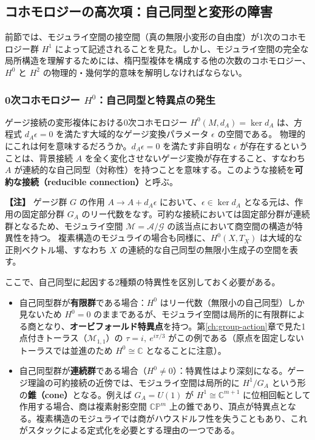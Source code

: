 \documentclass[uplatex, dvipdfmx, book]{jsbook}
\let\origsubsection\subsection
\let\origsubsubsection\subsubsection
\renewcommand{\section}{\origsubsection}
\renewcommand{\subsection}{\origsubsubsection}
\renewcommand{\subsubsection}{\paragraph}
\newenvironment{note}{\vspace{1ex}\par\footnotesize\noindent\textbf{【注】}}{\par\vspace{1ex}}
\begin{document}
\section{コホモロジーの高次項：自己同型と変形の障害}
\label{sec:higher-cohomology}

前節では、モジュライ空間の接空間（真の無限小変形の自由度）が1次のコホモロジー群 $H^1$ によって記述されることを見た。しかし、モジュライ空間の完全な局所構造を理解するためには、楕円型複体を構成する他の次数のコホモロジー、$H^0$ と $H^2$ の物理的・幾何学的意味を解明しなければならない。

\subsection{0次コホモロジー $H^0$：自己同型と特異点の発生}

ゲージ接続の変形複体における0次コホモロジー $H^0(M, d_A) = \ker d_A$ は、方程式 $d_A \epsilon = 0$ を満たす大域的なゲージ変換パラメータ $\epsilon$ の空間である。
物理的にこれは何を意味するだろうか。$d_A \epsilon = 0$ を満たす非自明な $\epsilon$ が存在するということは、背景接続 $A$ を全く変化させないゲージ変換が存在すること、すなわち $A$ が連続的な自己同型（対称性）を持つことを意味する。このような接続を\textbf{可約な接続（reducible connection）}と呼ぶ。

\begin{note}
ゲージ群 $G$ の作用 $A \to A + d_A \epsilon$ において、$\epsilon \in \ker d_A$ となる元は、作用の固定部分群 $G_A$ のリー代数をなす。可約な接続においては固定部分群が連続群となるため、モジュライ空間 $\mathcal{M} = \mathcal{A}/\mathcal{G}$ の該当点において商空間の構造が特異性を持つ。
複素構造のモジュライの場合も同様に、$H^0(X, T_X)$ は大域的な正則ベクトル場、すなわち $X$ の連続的な自己同型の無限小生成子の空間を表す。
\end{note}

ここで、自己同型に起因する2種類の特異性を区別しておく必要がある。
\begin{itemize}
    \item 自己同型群が\textbf{有限群}である場合：$H^0$ はリー代数（無限小の自己同型）しか見ないため $H^0 = 0$ のままであるが、モジュライ空間は局所的に有限群による商となり、\textbf{オービフォールド特異点}を持つ。第\ref{ch:group-action}章で見た1点付きトーラス（$\mathcal{M}_{1,1}$）の $\tau = i,\ e^{i\pi/3}$ がこの例である（原点を固定しないトーラスでは並進のため $H^0 \cong \mathbb{C}$ となることに注意）。
    \item 自己同型群が\textbf{連続群}である場合（$H^0 \neq 0$）：特異性はより深刻になる。ゲージ理論の可約接続の近傍では、モジュライ空間は局所的に $H^1 / G_A$ という形の\textbf{錐（cone）}となる。例えば $G_A = U(1)$ が $H^1 \cong \mathbb{C}^{m+1}$ に位相回転として作用する場合、商は複素射影空間 $\mathbb{CP}^m$ 上の錐であり、頂点が特異点となる。複素構造のモジュライでは商がハウスドルフ性を失うこともあり、これがスタックによる定式化を必要とする理由の一つである。
\end{itemize}
\end{document}
